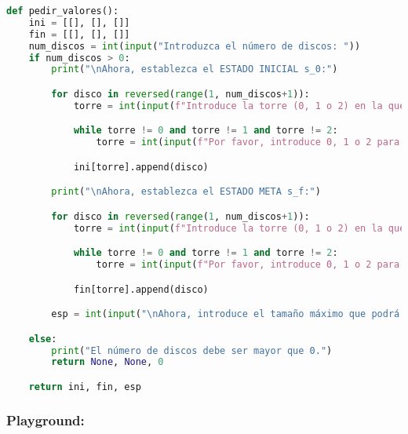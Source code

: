 \documentclass{article}
\begin{document}
\begin{lstlisting}[language=Python]
def pedir_valores():
    ini = [[], [], []]
    fin = [[], [], []]
    num_discos = int(input("Introduzca el número de discos: "))
    if num_discos > 0:
        print("\nAhora, establezca el ESTADO INICIAL s_0:")

        for disco in reversed(range(1, num_discos+1)):
            torre = int(input(f"Introduce la torre (0, 1 o 2) en la que quieres apilar el disco {disco}: "))

            while torre != 0 and torre != 1 and torre != 2:
                torre = int(input(f"Por favor, introduce 0, 1 o 2 para introducir el disco {disco} en dicha torre: "))

            ini[torre].append(disco)

        print("\nAhora, establezca el ESTADO META s_f:")

        for disco in reversed(range(1, num_discos+1)):
            torre = int(input(f"Introduce la torre (0, 1 o 2) en la que quieres apilar el disco {disco}: "))

            while torre != 0 and torre != 1 and torre != 2:
                torre = int(input(f"Por favor, introduce 0, 1 o 2 para introducir el disco {disco} en dicha torre: "))

            fin[torre].append(disco)

        esp = int(input("\nAhora, introduce el tamaño máximo que podrá tener el espacio de estados: "))

    else:
        print("El número de discos debe ser mayor que 0.")
        return None, None, 0

    return ini, fin, esp
\end{lstlisting}

\subsubsection*{Playground:}
\end{document}
